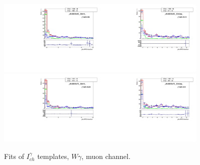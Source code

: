 \begin{figure}[htb]
\begin{center}
   \includegraphics[width=0.45\textwidth]{../figs/figs_v11/MUON_WGamma/TemplateFits/c_TEMPL_CHISO_UNblind__phoEt55to65__Barrel__RooFit.pdf}\includegraphics[width=0.45\textwidth]{../figs/figs_v11/MUON_WGamma/TemplateFits/c_TEMPL_CHISO_UNblind__phoEt55to65__Endcap__RooFit.pdf}\\
   \includegraphics[width=0.45\textwidth]{../figs/figs_v11/MUON_WGamma/TemplateFits/c_TEMPL_CHISO_UNblind__phoEt65to75__Barrel__RooFit.pdf}\includegraphics[width=0.45\textwidth]{../figs/figs_v11/MUON_WGamma/TemplateFits/c_TEMPL_CHISO_UNblind__phoEt65to75__Endcap__RooFit.pdf}\\
  \label{fig:templateFits_CHISO_MUON_2}
  \caption{Fits of $I_{ch}^{\gamma}$ templates, $W\gamma$, muon channel.}
  \end{center}
\end{figure}

